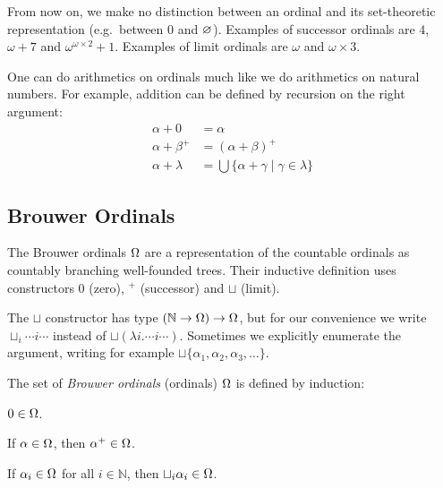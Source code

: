 From now on, we make no distinction between an ordinal and its set-theoretic
representation (e.g.\ between $0$ and $\varnothing$). Examples of successor
ordinals are $4$, $\omega + 7$  and $\omega^{\omega \times 2} + 1$. Examples
of limit ordinals are $\omega$ and $\omega \times 3$.


One can do arithmetics on ordinals much like we do arithmetics on natural
numbers. For example, addition can be defined by recursion on the right
argument:
\begin{align*}
  \alpha + 0       &= \alpha\\
  \alpha + \beta^+ &= (\alpha + \beta)^+\\
  \alpha + \lambda &= \bigcup \{ \alpha + \gamma \; | \; \gamma \in \lambda \}
\end{align*}


\subsection{Brouwer Ordinals}\label{sub:brouwer}



The Brouwer ordinals $\Omega$ are a representation of the countable ordinals as
countably branching well-founded trees. Their inductive definition
uses constructors $0$ (zero), $^+$ (successor) and $\sqcup$ (limit).

The $\sqcup$ constructor has type $(\mathbb{N} \rightarrow \Omega) \rightarrow
\Omega$, but for our convenience we write $\sqcup_i \cdots i \cdots$ instead
of $\sqcup (\lambda i . \cdots i \cdots)$. Sometimes we explicitly enumerate
the argument, writing for example $\sqcup \{ \alpha_1, \alpha_2,
\alpha_3, \ldots \}$.

\begin{definition}\label{def:ordinals}%
The set of \emph{Brouwer ordinals} (ordinals) $\Omega$ is defined by
induction:
\begin{compactenum}
  \item
    $0 \in \Omega$.
  \item
    If $\alpha \in \Omega$, then $\alpha^+ \in \Omega$.
  \item
    If $\alpha_i \in \Omega$ for all $i \in \mathbb{N}$, then $\sqcup_i
    \alpha_i \in \Omega$.
\end{compactenum}
\end{definition}

